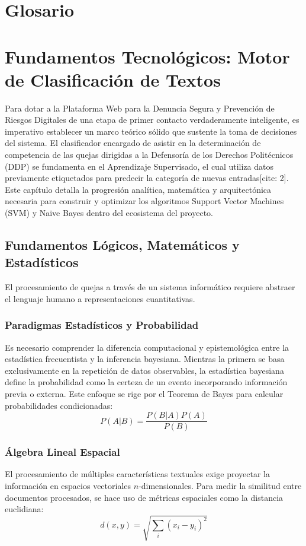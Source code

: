 \chapter{Glosario}

\chapter{Fundamentos Tecnológicos: Motor de Clasificación de Textos}
\label{ch:fundamentos_clasificacion}

    Para dotar a la Plataforma Web para la Denuncia Segura y Prevención de Riesgos Digitales de una etapa de primer contacto verdaderamente inteligente, es imperativo establecer un marco teórico sólido que sustente la toma de decisiones del sistema. El clasificador encargado de asistir en la determinación de competencia de las quejas dirigidas a la Defensoría de los Derechos Politécnicos (DDP) se fundamenta en el Aprendizaje Supervisado, el cual utiliza datos previamente etiquetados para predecir la categoría de nuevas entradas[cite: 2]. Este capítulo detalla la progresión analítica, matemática y arquitectónica necesaria para construir y optimizar los algoritmos Support Vector Machines (SVM) y Naive Bayes dentro del ecosistema del proyecto.

\section{Fundamentos Lógicos, Matemáticos y Estadísticos}

    El procesamiento de quejas a través de un sistema informático requiere abstraer el lenguaje humano a representaciones cuantitativas.
    
    \subsection{Paradigmas Estadísticos y Probabilidad}
    Es necesario comprender la diferencia computacional y epistemológica entre la estadística frecuentista y la inferencia bayesiana. Mientras la primera se basa exclusivamente en la repetición de datos observables, la estadística bayesiana define la probabilidad como la certeza de un evento incorporando información previa o externa. Este enfoque se rige por el Teorema de Bayes para calcular probabilidades condicionadas:
    $$P(A|B)=\frac{P(B|A)P(A)}{P(B)}$$
    
    \subsection{Álgebra Lineal Espacial}
    El procesamiento de múltiples características textuales exige proyectar la información en espacios vectoriales $n$-dimensionales. Para medir la similitud entre documentos procesados, se hace uso de métricas espaciales como la distancia euclidiana:
    $$d(x,y)=\sqrt{\sum_{i}(x_{i}-y_{i})^{2}}$$

